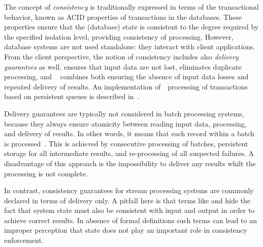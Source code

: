 \label{fs-preliminaries}

The concept of {\em consistency} is traditionally expressed in terms of the transactional behavior, known as ACID properties of transactions in the databases. 
 These properties ensure that the (database) state is consistent to the degree required by the specified isolation level, providing consistency of processing. 
 However, database systems are not used standalone: they  	interact  with client applications.
  From the client perspective,   the notion of consistency includes also  {\em delivery guarantees} as well. {\em \Alo} ensures that input data are not lost, {\em \amo} eliminates duplicate processing, and {\em ~\eo} combines both ensuring the absence of input data losses and repeated delivery of results. An implementation of~\eo\ processing of transactions based on persistent queues is described in~\cite{DBLP:books/mk/WeikumV2002}.



Delivery guarantees are typically not considered in batch processing systems, because they always ensure atomicity between reading input data, processing, and delivery of results. In other words, it means that each record within a batch is processed~\eo. This is achieved by consecutive processing of batches, persistent storage for all intermediate results, and re-processing of all suspected failures. 
A disadvantage of this approach is the impossibility to deliver any results whilt the processing is not complete.

In contrast,   consistency guarantees   for  stream processing systems   are commonly declared in terms of delivery only. 
A pitfall here is that terms like {\em \eo} and {\em \alo} hide the fact that system state must also be consistent with input and output in order to achieve correct results. 
In absence of formal definitions such terms  can lead to an improper perception that state does not play an important role in consistency enforcement. 

